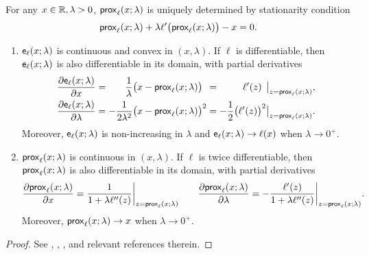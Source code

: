 \begin{lem} \label{lem:prox}
For any $x \in \mathbb{R}, \lambda > 0$, $\mathsf{prox}_{\ell}(x; \lambda)$ is uniquely determined by stationarity condition
    \begin{equation*}
        \mathsf{prox}_{\ell}(x; \lambda) + \lambda \ell'\bigl( \mathsf{prox}_{\ell}(x; \lambda) \bigr) - x = 0.
    \end{equation*}
    \begin{enumerate}[label=(\alph*)]
        \item \label{lem:prox(a)}
        $\mathsf{e}_\ell(x; \lambda)$ is continuous and convex in $(x, \lambda)$. If $\ell$ is differentiable, then $\mathsf{e}_\ell(x; \lambda)$ is also differentiable in its domain, with partial derivatives
        \begin{equation*}
            \begin{aligned}
                \frac{\partial \envelope_\ell(x; \lambda)}{\partial x}
            & = 
            \mathmakebox[\widthof{$\displaystyle -\frac{1}{2\lambda^2} \big( x - \prox_{\ell}(x; \lambda) \big)^2$}][r]{\frac{1}{\lambda} \big( x - \prox_{\ell}(x; \lambda) \big)\phantom{^2}}
            = 
            \mathmakebox[\widthof{$\displaystyle -\frac12 \bigl(\ell'(z) \bigr)^2 \big|_{z = \prox_{\ell}(x; \lambda) }$}][r]{
            \ell'(z) \phantom{^2} \big|_{z = \prox_{\ell}(x; \lambda) }
            },
            \\
                \frac{\partial \envelope_\ell(x; \lambda)}{\partial \lambda}
            & = -\frac{1}{2\lambda^2} \big( x - \prox_{\ell}(x; \lambda) \big)^2
            = -\frac12 \bigl(\ell'(z) \bigr)^2 \big|_{z = \prox_{\ell}(x; \lambda) }.
            \end{aligned}
        \end{equation*}
        Moreover, $\mathsf{e}_\ell(x; \lambda)$ is non-increasing in $\lambda$ and $\mathsf{e}_\ell(x; \lambda) \to \ell(x)$ when $\lambda \to 0^+$.
        \item \label{lem:prox(b)}
        $\mathsf{prox}_{\ell}(x; \lambda)$ is continuous in $(x, \lambda)$. If $\ell$ is twice differentiable, then $\mathsf{prox}_\ell(x; \lambda)$ is also differentiable in its domain, with partial derivatives
        \begin{equation*}
            \frac{\partial \mathsf{prox}_{\ell}(x; \lambda)}{\partial x}
            =  \frac{1}{1 + \lambda \ell''(z)} \bigg|_{z = \mathsf{prox}_{\ell}(x; \lambda)}
            \qquad
            \frac{\partial \mathsf{prox}_{\ell}(x; \lambda)}{\partial \lambda}
            =  -\frac{\ell'(z)}{1 + \lambda \ell''(z)} \bigg|_{z = \mathsf{prox}_{\ell}(x; \lambda)} .
        \end{equation*}
        Moreover, $\mathsf{prox}_\ell(x; \lambda) \to x$ when $\lambda \to 0^+$.
    \end{enumerate}
\end{lem}
\begin{proof}
See \cite[Lemma 15]{thrampoulidis2018precise}, \cite[Proposition A.1]{donoho2016high}, \cite[Lemma 2, Lemma 4]{salehi2019impact}, and relevant references therein.
\end{proof}


